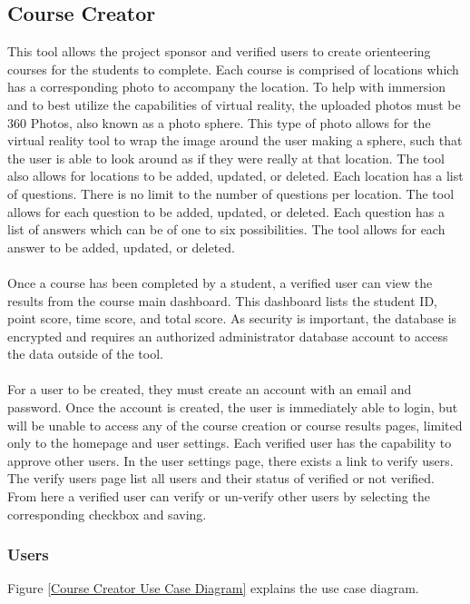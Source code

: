 \subsection{Course Creator}
This tool allows the project sponsor and verified users to create orienteering courses for the students to complete. Each course is comprised of locations which has a corresponding photo to accompany the location. To help with immersion and to best utilize the capabilities of virtual reality, the uploaded photos must be 360 Photos, also known as a photo sphere. This type of photo allows for the virtual reality tool to wrap the image around the user making a sphere, such that the user is able to look around as if they were really at that location. The tool also allows for locations to be added, updated, or deleted. Each location has a list of questions. There is no limit to the number of questions per location. The tool allows for each question to be added, updated, or deleted. Each question has a list of answers which can be of one to six possibilities. The tool allows for each answer to be added, updated, or deleted. \\
\\
Once a course has been completed by a student, a verified user can view the results from the course main dashboard. This dashboard lists the student ID, point score, time score, and total score. As security is important, the database is encrypted and requires an authorized administrator database account to access the data outside of the tool. \\
\\
For a user to be created, they must create an account with an email and password. Once the account is created, the user is immediately able to login, but will be unable to access any of the course creation or course results pages, limited only to the homepage and user settings. Each verified user has the capability to approve other users. In the user settings page, there exists a link to verify users. The verify users page list all users and their status of verified or not verified. From here a verified user can verify or un-verify other users by selecting the corresponding checkbox and saving. 


\subsubsection{Users}
Figure \ref{Course Creator Use Case Diagram} explains the use case diagram.

